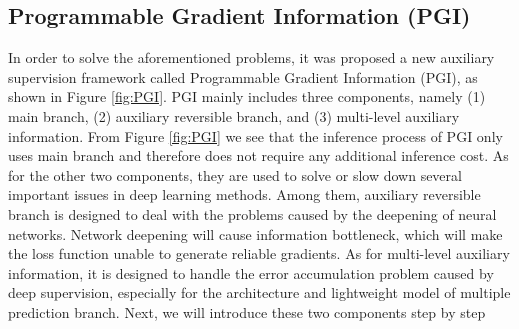     \subsection{Programmable Gradient Information (PGI)}
        In order to solve the aforementioned problems, it was proposed 
        a new auxiliary supervision framework called Programmable 
        Gradient Information (PGI), as shown in Figure \ref{fig:PGI}.
        PGI mainly includes three components, namely
        (1) main branch, (2) auxiliary reversible branch, and (3)
        multi-level auxiliary information. From Figure \ref{fig:PGI} we
        see that the inference process of PGI only uses main branch
        and therefore does not require any additional inference cost.
        As for the other two components, they are used to solve or
        slow down several important issues in deep learning methods. 
        Among them, auxiliary reversible branch is designed
        to deal with the problems caused by the deepening of neural
        networks. Network deepening will cause information bottleneck, 
        which will make the loss function unable to generate reliable
        gradients. As for multi-level auxiliary information, it is designed
        to handle the error accumulation problem
        caused by deep supervision, especially for the architecture
        and lightweight model of multiple prediction branch. Next,
        we will introduce these two components step by step

